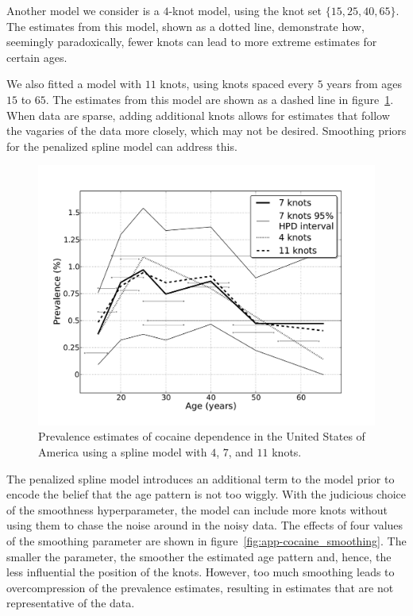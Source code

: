 Another model we consider is a $4$-knot model, using the knot set $\{15, 25,
40, 65\}$.  The estimates from this model, shown as a dotted line,
demonstrate how, seemingly paradoxically, fewer knots can lead to more
extreme estimates for certain ages.

We also fitted a model with $11$ knots, using knots spaced every $5$ years from
ages $15$ to $65$.
The estimates from this model are shown as a dashed line in
figure~\ref{fig:app-cocaine_knots}.  When data are sparse, adding
additional knots allows for estimates that follow the vagaries of the
data more closely, which may not be desired.  Smoothing priors for the
penalized spline model can address this.

    \begin{figure}[h]
        \begin{center}
            \includegraphics[width=\textwidth]{applications/cocaine_dependence-knots.pdf}
            \caption[Prevalence estimates of cocaine dependence using spline 
            models with varying numbers of knots.]{Prevalence estimates of cocaine dependence in the United States of America using a spline model with $4$, $7$, and $11$ knots. }
            \label{fig:app-cocaine_knots}
        \end{center}
    \end{figure}

The penalized spline model introduces an additional term to the model
prior to encode the belief that the age pattern is not too wiggly.
With the judicious choice of the smoothness hyperparameter, the model
can include more knots without using them to chase the noise around in
the noisy data.  The effects of four values of the smoothing parameter
are shown in figure~\ref{fig:app-cocaine_smoothing}.  The smaller the
parameter, the smoother the estimated age pattern and, hence, the less
influential the position of the knots.  However, too much smoothing
leads to overcompression of the prevalence estimates, resulting in estimates
that are not representative of the data.

